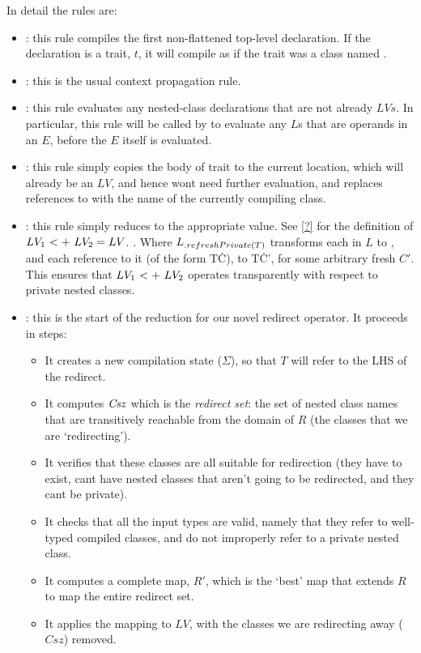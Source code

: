 \noindent In detail the rules are:
\begin{itemize}
	\item {}: this rule compiles the first non-flattened top-level declaration. If the declaration is a trait, $t$, it will compile as if the trait was a class named \This.
	\item {}: this is the usual context propagation rule.
	\item {}: this rule evaluates any nested-class declarations that are not already $LVs$. In particular, this rule will be called by  to evaluate any $L$s that are operands in an $E$, before the $E$ itself is evaluated.
	\item {}: this rule simply copies the body of trait to the current location, which will already be an $LV$, and hence wont need further evaluation, and replaces references to \This with the name of the currently compiling class.
	\item {}: this rule simply reduces to the appropriate value. See \autoref{?} for the definition of $\summ{LV_1}{LV_2}=LV$. . Where $L{{}_{.{refreshPrivate}({T})}}$ transforms each  in $L$ to , and each reference to it (of the form T\.C), to T\.C', for some arbitrary fresh $C'$. This ensures that $\summ{LV_1}{LV_2}$ operates transparently with respect to private nested classes.  
	\item {}: this is the start of the reduction for our novel redirect operator. It proceeds in steps:
	\begin{itemize}
		\item It creates a new compilation state ($\Sigma$), so that $T$ will refer to the LHS of the redirect.
		\item It computes $\mathit{Csz}$ which is the \emph{redirect set}: the set of nested class names that are transitively reachable from the domain of $R$ (the classes that we are `redirecting').
		\item It verifies that these classes are all suitable for redirection (they have to exist, cant have nested classes that aren't going to be redirected, and they cant be private).
		\item It checks that all the input types are valid, namely that they refer to well-typed compiled classes, and do not improperly refer to a private nested class.
		\item It computes a complete map, $R'$, which is the `best' map that extends  $R$ to map the entire redirect set.
		\item It applies the mapping to $LV$, with the classes we are redirecting away ($Csz$) removed.
	\end{itemize}
\end{itemize}


